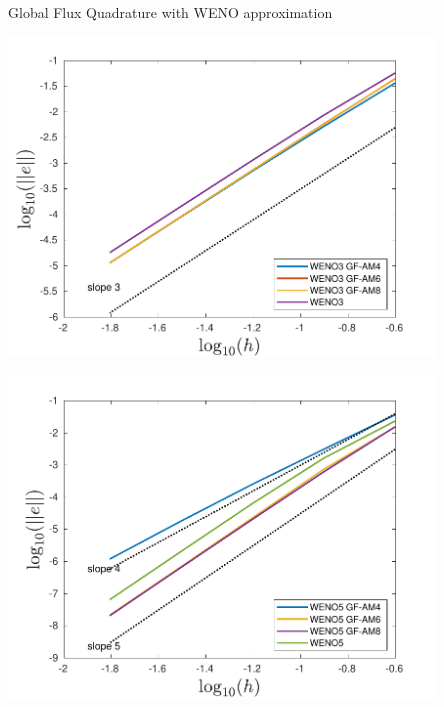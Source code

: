 \begin{frame}[t]{Global Flux Quadrature  with WENO approximation}
{	
	\begin{minipage}{0.5\textwidth}
		\centering\includegraphics[width=0.85\textwidth]{figs/WENO-FD/figures/Burgers/MMS/weno3_AM_MMS_conv} 
	\end{minipage}\hfill
	\begin{minipage}{0.5\textwidth}
		\centering\includegraphics[width=0.85\textwidth]{figs/WENO-FD/figures/Burgers/MMS/weno5_AM_MMS_conv} 
	\end{minipage}
}


\end{frame}
